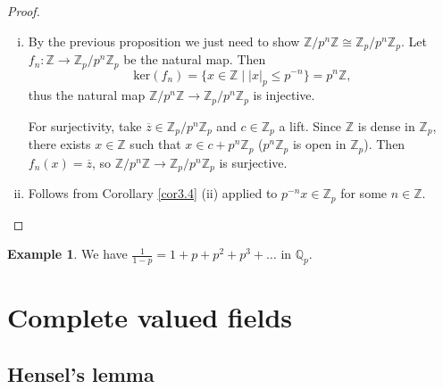 \documentclass{article}
\theoremstyle{definition}
\newtheorem{example}{Example}[section]
\begin{document}
\begin{proof}
    \begin{enumerate}[(i)]
        \item By the previous proposition we just need to show $\mathbb{Z}/p^n\mathbb{Z} \cong \mathbb{Z}_p/p^n\mathbb{Z}_p$. Let $f_n : \mathbb{Z} \to \mathbb{Z}_p/p^n \mathbb{Z}_p$ be the natural map. Then $$\text{ker}(f_n) =\{x \in \mathbb{Z} \mid |x|_p \le p^{-n}\} = p^n\mathbb{Z},$$ thus the natural map $\mathbb{Z}/p^n\mathbb{Z} \to \mathbb{Z}_p/p^n \mathbb{Z}_p$ is injective. 
        \vspace{1mm}
         
        For surjectivity, take $\overline{z} \in \mathbb{Z}_p/p^n \mathbb{Z}_p$ and $c \in \mathbb{Z}_p$ a lift. Since $\mathbb{Z}$ is dense in $\mathbb{Z}_p$, there exists $x \in \mathbb{Z}$ such that $x \in c + p^n \mathbb{Z}_p$ ($p^n \mathbb{Z}_p$ is open in $\mathbb{Z}_p$). Then $f_n(x) = \overline{z}$, so $\mathbb{Z}/p^n \mathbb{Z} \to \mathbb{Z}_p / p^n \mathbb{Z}_p$ is surjective.
        \item Follows from Corollary \ref{cor3.4} (ii) applied to $p^{-n} x \in \mathbb{Z}_p$ for some $n \in \mathbb{Z}$.
    \end{enumerate}
\end{proof}

\begin{example}
    We have $\frac{1}{1-p} = 1 + p + p^2 + p^3 + \ldots$ in $\mathbb{Q}_p$.
\end{example}

\section{Complete valued fields}

\subsection{Hensel's lemma}
\end{document}
